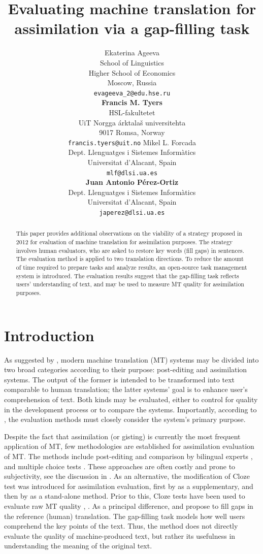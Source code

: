 \documentclass[11pt]{article}
\title{Evaluating machine translation for assimilation via a gap-filling task}
\author{Ekaterina Ageeva\\
  School of Linguistics\\
  Higher School of Economics\\
  Moscow, Russia\\
  {\tt evageeva\_2@edu.hse.ru}\\[2ex]
  \textbf{Francis M. Tyers}\\
  HSL-fakultetet\\ 
  UiT Norgga \'{a}rktala\v{s} universitehta \\
  9017 Romsa, Norway \\
  {\tt francis.tyers@uit.no}
  \And
  Mikel L. Forcada\\
  Dept. Llenguatges i Sistemes Inform\`{a}tics\\
  Universitat d'Alacant, Spain \\
  {\tt mlf@dlsi.ua.es}  \\[2ex]
  \textbf{Juan Antonio P\'{e}rez-Ortiz} \\
  Dept. Llenguatges i Sistemes Inform\`{a}tics\\
  Universitat d'Alacant, Spain \\
  {\tt japerez@dlsi.ua.es}
}
\date{}
\newcommand{\comment}[1]{\marginpar{\scriptsize\sf \textcolor{blue}{#1}}}
\begin{document}
\maketitle
\comment{EA: has not it first been used in trosterud12?}
\begin{abstract}
This paper provides additional observations on the viability of a strategy proposed in 2012 for evaluation of machine translation for assimilation purposes. The strategy involves human evaluators, who are asked to restore key words (fill gaps) in sentences. The evaluation method is applied to two translation directions. To reduce the amount of time required to prepare tasks and analyze results, an open-source task management system is introduced. The evaluation results suggest that the gap-filling task reflects users' understanding of text, and may be used to measure MT quality for assimilation purposes.
\end{abstract}

\section{Introduction}

As suggested by \citet{church93}, modern machine translation (MT) systems may
be divided into two broad categories according to their purpose: post-editing and assimilation systems. The output of the former is intended to be transformed into text comparable to human translation; the latter systems' goal is to enhance user's comprehension of text. Both kinds may be evaluated, either to control for quality in the development process or to compare the systems. Importantly, according to \citet{church93}, the evaluation methods must closely consider the system's primary purpose.

\comment{EA: I'd like a citation for the ``most massive application'', could you suggest something? It is from Mikel's paper, but no reference there -- should I cite Mikel?}
Despite the fact that assimilation (or gisting) is currently the most frequent application of MT, few methodologies are established for assimilation evaluation of MT. The methods include post-editing and comparison by bilingual experts \citep{ginesti09}, and multiple choice tests \citep{jones07,trosterud12}. These approaches are often costly and prone to subjectivity, see the discussion in \cite{oregan13}. As an alternative, the modification of Cloze \citep{taylor53} test was introduced for assimilation evaluation, first by \citep{trosterud12} as a supplementary, and then by \citep{oregan13} as a stand-alone method. Prior to this, Cloze tests have been used to evaluate raw MT quality \citep{vanslype79}, \citep{somers00}. As a principal difference, \citet{trosterud12} and \citet{oregan13} propose to fill gaps in the reference (human) translation. The gap-filling task models how well users comprehend the key points of the text. Thus, the method does not directly evaluate the quality of machine-produced text, but rather its usefulness in understanding the meaning of the original text. 
\end{document}
